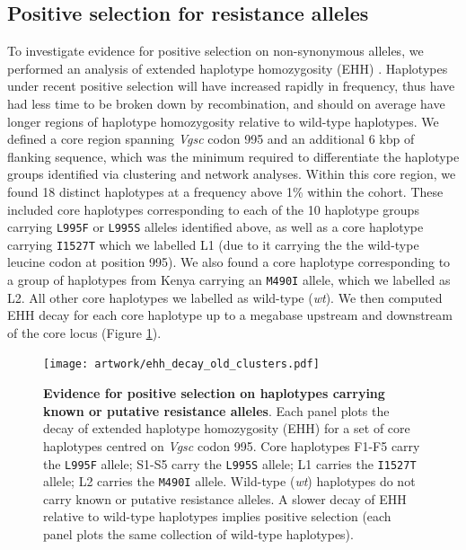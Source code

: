 \documentclass[a4paper,11pt,abstracton,hidelinks]{scrartcl}
\begin{document}
\subsection*{Positive selection for resistance alleles}

%
To investigate evidence for positive selection on non-synonymous alleles, we performed an analysis of extended haplotype homozygosity (EHH) \cite{Sabeti2002}.
%
Haplotypes under recent positive selection will have increased rapidly in frequency, thus have had less time to be broken down by recombination, and should on average have longer regions of haplotype homozygosity relative to wild-type haplotypes.
%
We defined a core region spanning \textit{Vgsc} codon 995 and an additional 6 kbp of flanking sequence, which was the minimum required to differentiate the haplotype groups identified via clustering and network analyses.
%
Within this core region, we found 18 distinct haplotypes at a frequency above 1\% within the cohort.
%
These included core haplotypes corresponding to each of the 10 haplotype groups carrying \texttt{L995F} or \texttt{L995S} alleles identified above, as well as a core haplotype carrying \texttt{I1527T} which we labelled L1 (due to it carrying the the wild-type leucine codon at position 995).
%
We also found a core haplotype corresponding to a group of haplotypes from Kenya carrying an \texttt{M490I} allele, which we labelled as L2.
%
All other core haplotypes we labelled as wild-type (\textit{wt}).
%
We then computed EHH decay for each core haplotype up to a megabase upstream and downstream of the core locus (Figure \ref{fig:ehh_decay}).
%


%
\begin{figure}[!t]
  \texttt{[image: artwork/ehh\_decay\_old\_clusters.pdf]}
  \caption{\textbf{Evidence for positive selection on haplotypes carrying known or putative resistance alleles}. Each panel plots the decay of extended haplotype homozygosity (EHH) for a set of core haplotypes centred on \textit{Vgsc} codon 995. Core haplotypes F1-F5 carry the \texttt{L995F} allele; S1-S5 carry the \texttt{L995S} allele; L1 carries the \texttt{I1527T} allele; L2 carries the \texttt{M490I} allele. Wild-type (\textit{wt}) haplotypes do not carry known or putative resistance alleles. A slower decay of EHH relative to wild-type haplotypes implies positive selection (each panel plots the same collection of wild-type haplotypes).}
  \label{fig:ehh_decay}
\end{figure}
\end{document}
